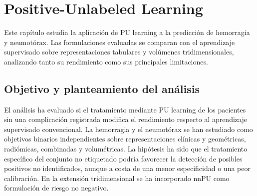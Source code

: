 \chapter{Positive-Unlabeled Learning}\label{chap:pu_learning}

Este capítulo estudia la aplicación de PU learning a la predicción de hemorragia y neumotórax. Las formulaciones evaluadas se comparan con el aprendizaje supervisado sobre representaciones tabulares y volúmenes tridimensionales, analizando tanto su rendimiento como sus principales limitaciones.

\section{Objetivo y planteamiento del análisis}




El análisis ha evaluado si el tratamiento mediante PU learning de los pacientes sin una complicación registrada modifica el rendimiento respecto al aprendizaje supervisado convencional. La hemorragia y el neumotórax se han estudiado como objetivos binarios independientes sobre representaciones clínicas y geométricas, radiómicas, combinadas y volumétricas. La hipótesis ha sido que el tratamiento específico del conjunto no etiquetado podría favorecer la detección de posibles positivos no identificados, aunque a costa de una menor especificidad o una peor calibración. En la extensión tridimensional se ha incorporado nnPU como formulación de riesgo no negativo.

